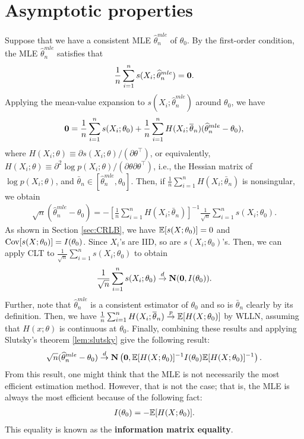 \documentclass[11pt, A4paper, openany, uplatex]{book}
\begin{document}
\section{Asymptotic properties}
Suppose that we have a consistent MLE $\hat \theta_n^{mle}$ of $\theta_0$.
By the first-order condition, the MLE $\hat \theta_n^{mle}$ satisfies that
\[
	\frac{1}{n}\sum_{i = 1}^n s(X_i; \widehat \theta_n^{mle}) = \mathbf{0}.
\]
Applying the mean-value expansion to $s(X_i; \hat \theta_n^{mle}) $ around $\theta_0$, we have
\[
	\mathbf{0} = \frac{1}{n}\sum_{i = 1}^n s(X_i; \theta_0) + \frac{1}{n}\sum_{i=1}^n H(X_i; \overline \theta_n) (\widehat \theta_n^{mle} - \theta_0),
\]
where $H(X_i; \theta) \equiv \partial s(X_i; \theta)/(\partial \theta^\top)$, or equivalently, $H(X_i; \theta) \equiv \partial^2 \log p(X_i; \theta)/(\partial \theta \partial \theta^\top)$, i.e., the Hessian matrix of $\log p(X_i; \theta)$, and $\bar \theta_n \in [\hat \theta_n^{mle}, \theta_0]$.
Then, if $\frac{1}{n}\sum_{i=1}^n H(X_i; \bar \theta_n) $ is nonsingular, we obtain
\begin{align}\label{eq:taylor}
	\sqrt{n}(\hat \theta_n^{mle} - \theta_0) = -\left[\frac{1}{n}\sum_{i=1}^n H(X_i; \bar \theta_n) \right]^{-1}\frac{1}{\sqrt{n}}\sum_{i = 1}^n s(X_i; \theta_0).
\end{align}
As shown in Section \ref{sec:CRLB}, we have $\mathbb{E}[s(X; \theta_0)] = 0$ and $\mathrm{Cov}[s(X; \theta_0)] = I(\theta_0)$.
Since $X_i$'s are IID, so are $s(X_i; \theta_0)$'s.
Then, we can apply CLT to $\frac{1}{\sqrt{n}}\sum_{i = 1}^n s(X_i; \theta_0)$ to obtain
\[
	\frac{1}{\sqrt{n}}\sum_{i = 1}^n s(X_i; \theta_0) \overset{d}{\to} \mathbf{N}(\mathbf{0},  I(\theta_0)).
\]
Further, note that $\hat \theta_n^{mle}$ is a consistent estimator of $\theta_0$ and so is $\bar{\theta}_n$ clearly by its definition.
Then, we have $\frac{1}{n}\sum_{i=1}^n H(X_i; \overline \theta_n) \overset{p}{\to} \mathbb{E}[H(X; \theta_0)]$ by WLLN, assuming that $H(x; \theta)$ is continuous at $\theta_0$.
Finally, combining these results and applying Slutsky's theorem \ref{lem:slutsky} give the following result:
\[
	\sqrt{n}(\widehat \theta_n^{mle} - \theta_0) \overset{d}{\to} \mathbf{N}\left( \mathbf{0}, \mathbb{E}[H(X; \theta_0)]^{-1} I(\theta_0) \mathbb{E}[H(X; \theta_0)]^{-1} \right).
\]
From this result, one might think that the MLE is not necessarily the most efficient estimation method.
However, that is not the case; that is, the MLE is always the most efficient because of the following fact:
\begin{align}\label{eq:infoeq}
	I(\theta_0) = - \mathbb{E}[H(X; \theta_0)].
\end{align}
This equality is known as the \textbf{information matrix equality}.
\bigskip
\end{document}
